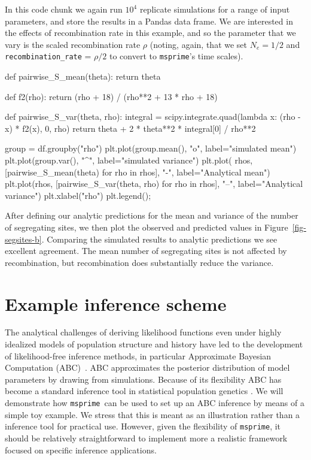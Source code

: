 \documentclass[graybox]{svmult}
\newcommand{\msprime}[0]{\texttt{msprime}}
\begin{document}
In this code chunk we again run $10^4$ replicate simulations for a range
of input parameters, and store the results in a Pandas data frame. We
are interested in the effects of recombination rate in this example,
and so the parameter that we vary is the scaled recombination rate
$\rho$ (noting, again, that we set $N_e = 1/2$ and
\texttt{recombination\_rate} = $\rho / 2$ to convert to \msprime's
time scales).

\begin{pythoncode}
def pairwise_S_mean(theta):
    return theta

def f2(rho):
    return (rho + 18) / (rho**2 + 13 * rho + 18)

def pairwise_S_var(theta, rho):
    integral = scipy.integrate.quad(lambda x: (rho - x) * f2(x), 0, rho)
    return theta + 2 * theta**2 * integral[0] / rho**2

group = df.groupby("rho")
plt.plot(group.mean(), "o", label="simulated mean")
plt.plot(group.var(), "^", label="simulated variance")
plt.plot(
    rhos, [pairwise_S_mean(theta) for rho in rhos], "-",
    label="Analytical mean")
plt.plot(rhos, [pairwise_S_var(theta, rho) for rho in rhos], "--",
label="Analytical variance")
plt.xlabel("rho")
plt.legend();
\end{pythoncode}

After defining our analytic predictions for the mean and variance of the
number of segregating sites, we then plot the observed and predicted values
in Figure~\ref{fig-segsites-b}.
Comparing the simulated results to analytic predictions we see
excellent agreement. The mean number of segregating sites is not
affected by recombination, but recombination does substantially reduce
the variance.

\section{Example inference scheme}\label{sec:inference}

    The analytical challenges of deriving likelihood functions even under
highly idealized models of population structure and history have led to
the development of likelihood-free inference methods, in particular
Approximate Bayesian Computation (ABC)~\citep{Beaumont2002}.
ABC approximates the posterior distribution of model parameters by drawing from
simulations. Because of its flexibility ABC has become a standard
inference tool in statistical population genetics \citep[see][for a review]{csillery2010approximate}.
We will demonstrate how \msprime\ can be used to set up an ABC inference
by means of a simple toy example. We stress that this is meant as an
illustration rather than a inference tool for practical use. However,
given the flexibility of \msprime, it should be
relatively straightforward to implement more a realistic framework focused
on specific inference applications.
\end{document}
